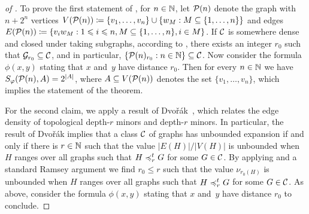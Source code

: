 \begin{proof}[of ]
To prove the first statement of , 
for $n\in \mathbb{N}$, let $\mathcal{P}(n)$ denote the graph with $n+2^n$ 
vertices $V(\mathcal{P}(n))\coloneqq \{v_1,\ldots, v_n\}\cup \{w_M : M\subseteq \{1,\ldots, n\}\}$ and edges $E(\mathcal{P}(n))\coloneqq \{v_iw_M :1\leqslant i\leqslant n, M\subseteq \{1,\ldots, n\}, i\in M\}$. 
If $\mathcal{C}$ is somewhere dense and closed under taking subgraphs, 
according to , there exists an integer $r_0$ 
such that $\mathcal{G}_{r_0}\subseteq \mathcal{C}$, and in particular, 
$\{\mathcal{P}(n)_{r_0} :n\in \mathbb{N}\}\subseteq \mathcal{C}$. Now consider 
the formula $\phi(x,y)$ stating that $x$ and~$y$ have 
distance $r_0$. Then for every $n\in \mathbb{N}$ we have 
$S_\varphi(\mathcal{P}(n),A)=2^{|A|}$, where $A\subseteq V(\mathcal{P}(n))$ denotes the set $\{v_1,\ldots, v_n\}$, which implies the statement
of the theorem.

For the second claim, we apply a result of Dvo\v{r}\'ak~\cite{dvorak2007asymptotical}, 
which relates the edge density of topological depth-$r$ minors
and depth-$r$ minors. In particular, the result of Dvo\v{r}\'ak
implies that a 
class $\mathcal{C}$ of graphs has unbounded expansion if and only 
if there is $r\in \mathbb{N}$ such that the value $|E(H)|/|V(H)|$ is unbounded
when $H$ ranges over all graphs such that $H\preccurlyeq_r^tG $ for some $G\in \mathcal{C}$.
 By applying  and 
a standard Ramsey argument we find $r_0\leq r$ such that the value
$\nu_{r_0(H)}$ is unbounded when $H$ ranges over all graphs such that $H\preccurlyeq_r^t G$
for some $G\in\mathcal{C}$. As above, consider 
the formula $\phi(x,y)$ stating that $x$ and~$y$ have 
distance $r_0$ to conclude. 
\end{proof}

